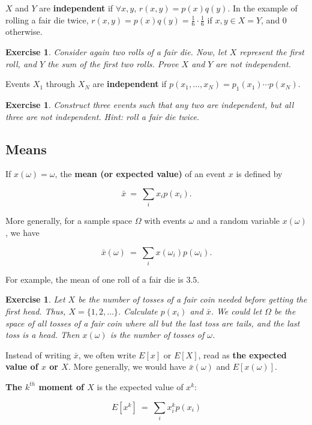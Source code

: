 \documentclass[12pt,letterpaper]{report}
\newcommand\be{\begin{equation}}
\newcommand\ee{\end{equation}}
\newtheorem{exe}[thm]{Exercise}
\begin{document}
$X$ and $Y$ are \textbf{independent} if $\forall x, y$, $r(x,y) =
p(x)q(y)$. In the example of rolling a fair die twice, $r(x,y) =
p(x)q(y) = \frac{1}{6}\cdot \frac{1}{6}$ if $x, y \in X = Y$, and
$0$ otherwise.


\begin{exe} Consider again two rolls of a fair die. Now, let $X$ represent the
first roll, and $Y$ the sum of the first two rolls. Prove $X$ and
$Y$ are not independent.
\end{exe}

Events $X_1$ through $X_N$ are \textbf{independent} if
$p(x_1,\dots, x_N) = p_1(x_1)\cdots p(x_N)$.

\begin{exe} Construct three events such that any two are
independent, but all three are not independent. Hint: roll a fair
die twice.
\end{exe}

\subsection{Means}

If $x(\omega) = \omega$, the \textbf{mean (or expected value)} of
an event $x$ is defined by

\be \bar{x} \ = \ \sum_i x_i p(x_i). \ee

More generally, for a sample space $\Omega$ with events $\omega$
and a random variable $x(\omega)$, we have

\be \bar{x}(\omega) \ = \ \sum_i x(\omega_i) p(\omega_i). \ee

For example, the mean of one roll of a fair die is $3.5$.

\begin{exe} Let $X$ be the number of tosses of a fair coin needed
before getting the first head. Thus, $X = \{1, 2, \dots \}$.
Calculate $p(x_i)$ and $\bar{x}$. We could let $\Omega$ be the
space of all tosses of a fair coin where all but the last toss are
tails, and the last toss is a head. Then $x(\omega)$ is the number
of tosses of $\omega$.
\end{exe}

Instead of writing $\bar{x}$, we often write $E[x]$ or $E[X]$,
read as \textbf{the expected value of $x$ or $X$}. More generally,
we would have $\bar{x}(\omega)$ and $E[x(\omega)]$.

\textbf{The $k^{th}$ moment of $X$} is the expected value of
$x^k$:

\be E[x^k] \ = \ \sum_i x_i^k p(x_i) \ee
\end{document}
